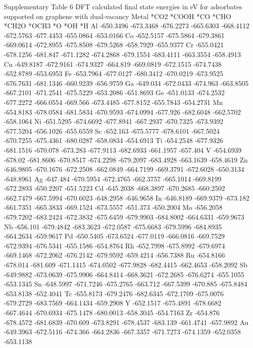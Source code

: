 Supplementary Table 6
DFT calculated final state energies in eV for adsorbates supported on graphene with dual-vacancy
Metal	*CO2	*COOH	*CO	*CHO	*CH2O	*OCH3	*O	*OH	*H
Al	-650.3496	-673.3468	-676.2273	-665.6303	-668.4112	-672.5763	-677.4453	-655.0864	-653.0166
Co	-652.5157	-675.5864	-679.3861	-669.0614	-672.8955	-675.8508	-679.5268	-658.7929	-655.9377
Cr	-655.0421	-678.1256	-681.847	-671.1282	-674.2868	-679.1554	-683.4111	-663.3554	-658.4913
Cu	-649.8187	-672.9161	-674.9327	-664.819	-669.0819	-672.1515	-674.7438	-652.8789	-653.6953
Fe	-653.7964	-677.0127	-680.3412	-670.0219	-673.9525	-676.7631	-681.1346	-660.9239	-656.9759
Ga	-649.034	-672.0433	-674.963	-663.8505	-667.2101	-671.2541	-675.5229	-653.2086	-651.8693
Ge	-651.0133	-674.2532	-677.2272	-666.0554	-669.566	-673.4485	-677.8152	-655.7843	-654.2731
Mn	-654.8183	-678.0584	-681.5834	-670.9593	-674.0994	-677.926	-682.6048	-662.5702	-658.1064
Ni	-651.5295	-674.6692	-677.8941	-667.2937	-670.7325	-673.9392	-677.5204	-656.1026	-655.6559
Sc	-652.163	-675.5777	-678.6101	-667.5024	-670.7255	-675.4361	-680.0287	-658.0834	-654.6913
Ti	-654.2548	-677.9326	-681.1516	-670.078	-673.283	-677.9113	-682.6933	-661.1957	-657.404
V	-654.6939	-678.02	-681.8606	-670.8517	-674.2298	-679.2097	-683.4928	-663.1639	-658.4619
Zn	-646.9805	-670.1676	-672.2508	-662.0849	-664.7199	-669.3791	-672.6028	-650.3134	-648.8961
Ag	-647.484	-670.5954	-672.4765	-662.3757	-665.1014	-669.8199	-672.2893	-650.2207	-651.5223
Cd	-645.2038	-668.3897	-670.2685	-660.2502	-662.7479	-667.5994	-670.6023	-648.2958	-646.9658
In	-646.8189	-669.9379	-673.182	-661.7351	-665.3833	-669.1524	-673.5557	-651.373	-650.2004
Mo	-656.2058	-679.7202	-683.2424	-672.3832	-675.6459	-679.9903	-684.8002	-664.6331	-659.9673
Nb	-656.101	-679.4842	-683.3623	-672.0587	-675.6683	-679.5996	-684.8935	-664.2634	-659.9617
Pd	-650.5405	-673.6524	-677.0119	-666.0816	-669.7529	-672.9394	-676.5341	-655.1586	-654.8764
Rh	-652.7998	-675.8992	-679.6974	-669.1468	-672.2062	-676.2142	-679.9592	-659.4214	-656.7388
Ru	-654.8166	-678.014	-681.609	-671.1415	-674.0502	-677.9828	-682.4415	-662.4653	-658.2092
Sb	-649.9882	-673.0639	-675.9906	-664.8414	-668.3621	-672.2685	-676.6274	-655.1055	-653.1345
Sn	-648.5997	-671.7246	-675.2765	-663.712	-667.5399	-670.885	-675.8484	-653.8138	-652.4041
Tc	-655.8173	-679.2476	-682.6345	-672.1709	-675.0076	-679.2729	-683.7569	-664.1434	-659.2908
Y	-652.1517	-675.4891	-678.6682	-667.4644	-670.6934	-675.1478	-680.0013	-658.3045	-654.7163
Zr	-654.876	-678.4572	-681.6839	-670.609	-673.8291	-678.4537	-683.139	-661.4741	-657.9892
Au	-649.3963	-672.5116	-674.366	-664.2836	-667.3357	-671.7273	-674.1359	-652.0358	-653.1138
